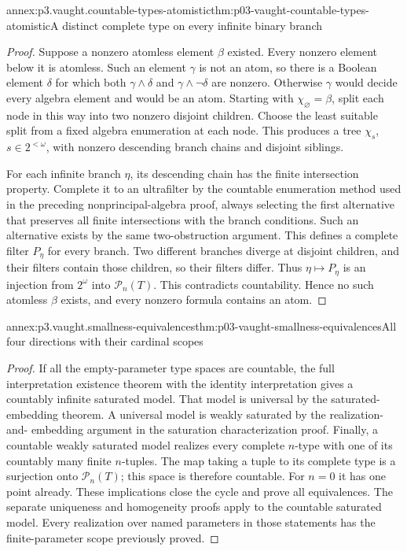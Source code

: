\begin{annexitem}{annex:p3.vaught.countable-types-atomistic}{thm:p03-vaught-countable-types-atomistic}{A distinct complete type on every infinite binary branch}
\begin{proof}
Suppose a nonzero atomless element \(\beta\) existed.
Every nonzero element below it is atomless.
Such an element \(\gamma\) is not an atom, so there is a
Boolean element \(\delta\) for which both
\(\gamma\land\delta\) and \(\gamma\land\neg\delta\) are nonzero.
Otherwise \(\gamma\) would decide every algebra element and
would be an atom.
Starting with \(\chi_{\varnothing}=\beta\), split each node
in this way into two nonzero disjoint children.
Choose the least suitable split from a fixed algebra enumeration
at each node. This produces a tree \(\chi_s\), \(s\in2^{<\omega}\),
with nonzero descending branch chains and disjoint siblings.

For each infinite branch \(\eta\), its descending chain has
the finite intersection property. Complete it to an ultrafilter
by the countable enumeration method used in the preceding
nonprincipal-algebra proof, always selecting the first alternative
that preserves all finite intersections with the branch conditions.
Such an alternative exists by the same two-obstruction argument.
This defines a complete filter \(P_\eta\) for every branch.
Two different branches diverge at disjoint children, and their
filters contain those children, so their filters differ.
Thus \(\eta\mapsto P_\eta\) is an injection from \(2^\omega\)
into \(\mathcal P_n(T)\).
This contradicts countability. Hence no such atomless \(\beta\)
exists, and every nonzero formula contains an atom.
\end{proof}
\end{annexitem}

\begin{annexitem}{annex:p3.vaught.smallness-equivalences}{thm:p03-vaught-smallness-equivalences}{All four directions with their cardinal scopes}
\begin{proof}
If all the empty-parameter type spaces are countable, the full
interpretation existence theorem with the identity interpretation
gives a countably infinite saturated model.
That model is universal by the saturated-embedding theorem.
A universal model is weakly saturated by the realization-and-
embedding argument in the saturation characterization proof.
Finally, a countable weakly saturated model realizes every
complete \(n\)-type with one of its countably many finite \(n\)-tuples.
The map taking a tuple to its complete type is a surjection onto
\(\mathcal P_n(T)\); this space is therefore countable.
For \(n=0\) it has one point already.
These implications close the cycle and prove all equivalences.
The separate uniqueness and homogeneity proofs apply to the
countable saturated model. Every realization over named parameters
in those statements has the finite-parameter scope previously proved.
\end{proof}
\end{annexitem}

